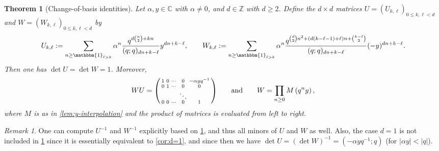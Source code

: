 \documentclass[reqno,11pt]{amsart}
\newtheorem{theorem}{Theorem}[section]
\theoremstyle{definition}
\theoremstyle{remark}
\newtheorem*{remark}{Remark}
\numberwithin{equation}{section}
\newcommand{\Z}{\mathbb{Z}}
\newcommand{\C}{\mathbb{C}}
\newcommand{\one}{\mathbbm{1}}
\newenvironment{psmall}
  {\left(\begin{smallmatrix}}
  {\end{smallmatrix}\right)}
\newcommand{\fix}[1]{\textcolor{blue}{\large (#1)\normalsize}}
\begin{document}
\begin{theorem}[Change-of-basis identities] \label{thm:change-of-basis}
Let $\alpha, y \in \C$ with $\alpha \neq 0$, and $d \in \Z$ with $d \ge 2$. Define the $d \times d$ matrices $U = (U_{k, \ell})_{0 \le k, \ell < d}$ and $W = (W_{k, \ell})_{0 \le k, \ell < d}$ by
\[
    U_{k, \ell} := \sum_{n \ge \one_{\ell > k}} \alpha^n \frac{q^{d\binom{n}{2} + kn}}{(q; q)_{dn+k-\ell}} y^{dn+k-\ell}, 
    \qquad 
    W_{k, \ell} := \sum_{n \ge \one_{\ell > k}} \alpha^n \frac{q^{\binom{d}{2}n^2 + (d(k-\ell-1)+\ell)n + \binom{k - \ell}{2}}}{(q; q)_{dn+k-\ell}} (-y)^{dn+k-\ell}.
\]
Then one has $\det U = \det W = 1$. Moreover,
\[
    W U = 
    \begin{psmall} 
    1 & 0 & \cdots & 0 & -\alpha y q^{-1}
    \\
    0 & 1 & \cdots & 0 & 0 
    \\
    & & & \ddots & \\
    0 & 0 & \cdots & 0 & 1
    \end{psmall}
    \qquad 
    \text{and}
    \qquad 
    W = \prod_{n \ge 0} M\left(q^n y\right),
\]
where $M$ is as in \cref{lem:y-interpolation} and the product of matrices is evaluated from left to right.
\end{theorem}
\begin{remark}
One can compute $U^{-1}$ and $W^{-1}$ explicitly based on \cref{thm:change-of-basis}, and thus all minors of $U$ and $W$ as well. Also, the case $d = 1$ is not included in \cref{thm:change-of-basis} since it is essentially equivalent to \cref{cor:d=1}, and since then we have $\det U = (\det W)^{-1} = \left(-\alpha y q^{-1}; q\right)$ (for  $|\alpha y| < |q|$).
\end{remark}
\end{document}
